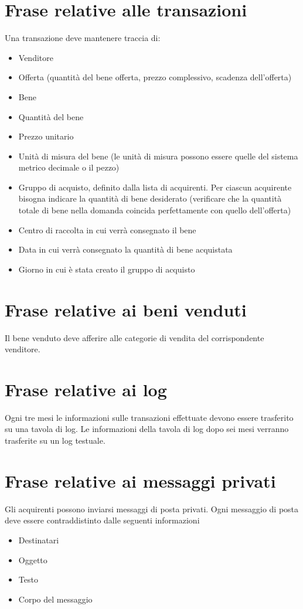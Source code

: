 \documentclass[a4paper, 10pt]{report}
\begin{document}
\section{Frase relative alle transazioni}
Una transazione deve mantenere traccia di:
\begin{itemize}
\item Venditore
\item Offerta (quantit\`a del bene offerta, prezzo complessivo, scadenza dell'offerta)
\item Bene
\item Quantit\`a del bene
\item Prezzo unitario
\item Unità di misura del bene (le unit\`a di misura possono essere quelle del sistema metrico decimale o il pezzo)
\item Gruppo di acquisto, definito dalla lista di acquirenti. Per ciascun acquirente bisogna indicare la quantit\`a di bene desiderato (verificare che la quantit\`a totale di bene nella domanda coincida perfettamente con quello dell'offerta)
\item Centro di raccolta in cui verr\`a consegnato il bene
\item Data in cui verr\`a consegnato la quantit\`a di bene acquistata
\item Giorno in cui \`e stata creato il gruppo di acquisto
\end{itemize}

\section{Frase relative ai beni venduti}
Il bene venduto deve afferire alle categorie di vendita del corrispondente venditore.

\section{Frase relative ai log}
Ogni tre mesi le informazioni sulle transazioni effettuate devono essere trasferito su una tavola di log. Le informazioni della tavola di log dopo sei mesi verranno trasferite su un log testuale.

\section{Frase relative ai messaggi privati}
Gli acquirenti possono inviarsi messaggi di posta privati. Ogni messaggio di posta deve essere contraddistinto dalle seguenti informazioni
\begin{itemize}
\item Destinatari
\item Oggetto
\item Testo
\item Corpo del messaggio
\end{itemize}
\end{document}
